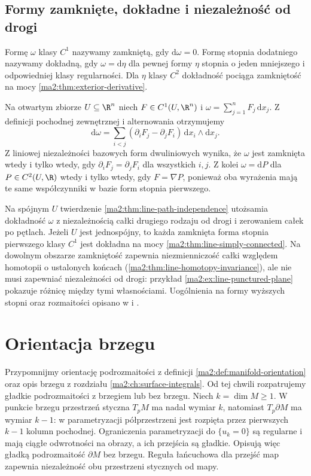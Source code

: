 \subsection{Formy zamknięte, dokładne i niezależność od drogi}

Formę $\omega$ klasy $C^1$ nazywamy zamkniętą,
gdy $\mathrm d\omega=0$. Formę stopnia dodatniego
nazywamy dokładną, gdy $\omega=\mathrm d\eta$
dla pewnej formy $\eta$ stopnia o jeden mniejszego
i odpowiedniej klasy regularności.
Dla $\eta$ klasy $C^2$ dokładność pociąga
zamkniętość na mocy
\ref{ma2:thm:exterior-derivative}.

Na otwartym zbiorze $U\subseteq\R^n$ niech
$F\in C^1(U,\R^n)$ i
$\omega=\sum_{j=1}^n F_j\,\mathrm dx_j$.
Z definicji pochodnej zewnętrznej i alternowania
otrzymujemy
\[
 \mathrm d\omega
 =\sum_{i<j}(\partial_iF_j-\partial_jF_i)
     \,\mathrm dx_i\wedge\mathrm dx_j.
\]
Z liniowej niezależności bazowych form
dwuliniowych wynika, że $\omega$ jest zamknięta
wtedy i tylko wtedy, gdy
$\partial_iF_j=\partial_jF_i$ dla wszystkich $i,j$.
Z kolei $\omega=\mathrm dP$ dla $P\in C^2(U,\R)$
wtedy i tylko wtedy, gdy $F=\nabla P$,
ponieważ oba wyrażenia mają te same współczynniki
w bazie form stopnia pierwszego.

Na spójnym $U$ twierdzenie
\ref{ma2:thm:line-path-independence}
utożsamia dokładność $\omega$ z niezależnością
całki drugiego rodzaju od drogi i zerowaniem
całek po pętlach. Jeżeli $U$ jest jednospójny,
to każda zamknięta forma stopnia pierwszego
klasy $C^1$ jest dokładna na mocy
\ref{ma2:thm:line-simply-connected}.
Na dowolnym obszarze zamkniętość zapewnia
niezmienniczość całki względem homotopii
o ustalonych końcach
(\ref{ma2:thm:line-homotopy-invariance}),
ale nie musi zapewniać niezależności od drogi:
przykład \ref{ma2:ex:line-punctured-plane}
pokazuje różnicę między tymi własnościami.
Uogólnienia na formy wyższych stopni oraz
rozmaitości opisano w
i .

\section{Orientacja brzegu}

Przypomnijmy orientację podrozmaitości z definicji
\ref{ma2:def:manifold-orientation} oraz opis brzegu
z rozdziału \ref{ma2:ch:surface-integrals}.
Od tej chwili rozpatrujemy gładkie podrozmaitości
z brzegiem lub bez brzegu. Niech $k=\dim M\ge1$.
W punkcie brzegu
przestrzeń styczna $T_pM$ ma nadal wymiar $k$,
natomiast $T_p\partial M$ ma wymiar $k-1$:
w parametryzacji półprzestrzeni jest rozpięta
przez pierwszych $k-1$ kolumn pochodnej.
Ograniczenia parametryzacji do $\{u_k=0\}$
są regularne i mają ciągłe odwrotności na obrazy,
a ich przejścia są gładkie. Opisują więc gładką
podrozmaitość $\partial M$ bez brzegu.
Reguła łańcuchowa dla przejść map zapewnia
niezależność obu przestrzeni stycznych od mapy.

